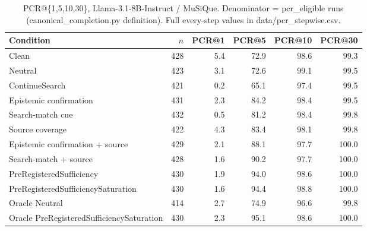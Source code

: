 \begin{table}[t]
\centering
\caption{PCR@\{1,5,10,30\}, Llama-3.1-8B-Instruct / MuSiQue. Denominator = pcr\_eligible runs (canonical\_completion.py definition). Full every-step values in data/pcr_stepwise.csv.}
\begin{tabular}{lrrrrr}
\toprule
Condition & $n$ & PCR@1 & PCR@5 & PCR@10 & PCR@30 \\
\midrule
Clean & 428 & 5.4 & 72.9 & 98.6 & 99.3 \\
Neutral & 423 & 3.1 & 72.6 & 99.1 & 99.5 \\
ContinueSearch & 421 & 0.2 & 65.1 & 97.4 & 99.5 \\
Epistemic confirmation & 431 & 2.3 & 84.2 & 98.4 & 99.5 \\
Search-match cue & 432 & 0.5 & 81.2 & 98.4 & 99.8 \\
Source coverage & 422 & 4.3 & 83.4 & 98.1 & 99.8 \\
Epistemic confirmation + source & 429 & 2.1 & 88.1 & 97.7 & 100.0 \\
Search-match + source & 428 & 1.6 & 90.2 & 97.7 & 100.0 \\
PreRegisteredSufficiency & 430 & 1.9 & 94.0 & 98.6 & 100.0 \\
PreRegisteredSufficiencySaturation & 430 & 1.6 & 94.4 & 98.8 & 100.0 \\
Oracle Neutral & 414 & 2.7 & 74.9 & 96.6 & 99.8 \\
Oracle PreRegisteredSufficiencySaturation & 430 & 2.3 & 95.1 & 98.6 & 100.0 \\
\bottomrule
\end{tabular}
\end{table}


